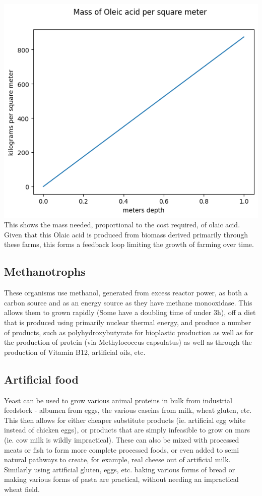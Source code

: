 \documentclass[10pt]{article}
\begin{document}
\includegraphics{fig_mass.png}
This shows the mass needed, proportional to the cost required, of olaic acid. Given that this Olaic acid is produced from biomass derived primarily through these farms, this forms a feedback loop limiting the growth of farming over time.

\subsection{Methanotrophs}
These organisms use methanol, generated from excess reactor power, as both a carbon source and as an energy source as they have methane monooxidase. This allows them to grown rapidly (Some have a doubling time of under 3h), off a diet that is produced using primarily nuclear thermal energy, and produce a number of products, such as polyhydroxybutyrate for bioplastic production as well as for the production of protein (via Methylococcus capsulatus) as well as through the production of Vitamin B12, artificial oils, etc.

\subsection{Artificial food}
Yeast can be used to grow various animal proteins in bulk from industrial feedstock - albumen from eggs, the various caseins from milk, wheat gluten, etc. This then allows for either cheaper substitute products (ie. artificial egg white instead of chicken eggs), or products that are simply infeasible to grow on mars (ie. cow milk is wildly impractical). These can also be mixed with processed meats or fish to form more complete processed foods, or even added to semi natural pathways to create, for example, real cheese out of artificial milk. Similarly using artificial gluten, eggs, etc. baking various forms of bread or making various forms of pasta are practical, without needing an impractical wheat field.
\end{document}

